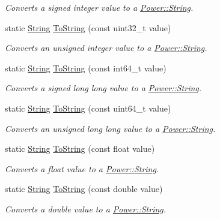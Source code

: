 \begin{DoxyCompactItemize}
\begin{DoxyCompactList}\small\item\em Converts a signed integer value to a \hyperlink{class_power_1_1_string}{Power\+::\+String}. \end{DoxyCompactList}\item 
static \hyperlink{class_power_1_1_string}{String} \hyperlink{class_power_1_1_string_adc77cae195a8cf75e8353f2c3f1e3893}{To\+String} (const uint32\+\_\+t value)
\begin{DoxyCompactList}\small\item\em Converts an unsigned integer value to a \hyperlink{class_power_1_1_string}{Power\+::\+String}. \end{DoxyCompactList}\item 
static \hyperlink{class_power_1_1_string}{String} \hyperlink{class_power_1_1_string_a5d8819bfc6a4877b59bd6782c5e75796}{To\+String} (const int64\+\_\+t value)
\begin{DoxyCompactList}\small\item\em Converts a signed long long value to a \hyperlink{class_power_1_1_string}{Power\+::\+String}. \end{DoxyCompactList}\item 
static \hyperlink{class_power_1_1_string}{String} \hyperlink{class_power_1_1_string_a986108efc696a9791ae48e7b6d71557c}{To\+String} (const uint64\+\_\+t value)
\begin{DoxyCompactList}\small\item\em Converts an unsigned long long value to a \hyperlink{class_power_1_1_string}{Power\+::\+String}. \end{DoxyCompactList}\item 
static \hyperlink{class_power_1_1_string}{String} \hyperlink{class_power_1_1_string_aa9619926b7b1b5011b77cb164b232f61}{To\+String} (const float value)
\begin{DoxyCompactList}\small\item\em Converts a float value to a \hyperlink{class_power_1_1_string}{Power\+::\+String}. \end{DoxyCompactList}\item 
static \hyperlink{class_power_1_1_string}{String} \hyperlink{class_power_1_1_string_a00829800eb265360178fd8af3186ebaf}{To\+String} (const double value)
\begin{DoxyCompactList}\small\item\em Converts a double value to a \hyperlink{class_power_1_1_string}{Power\+::\+String}. \end{DoxyCompactList}\item 

\end{DoxyCompactItemize}
